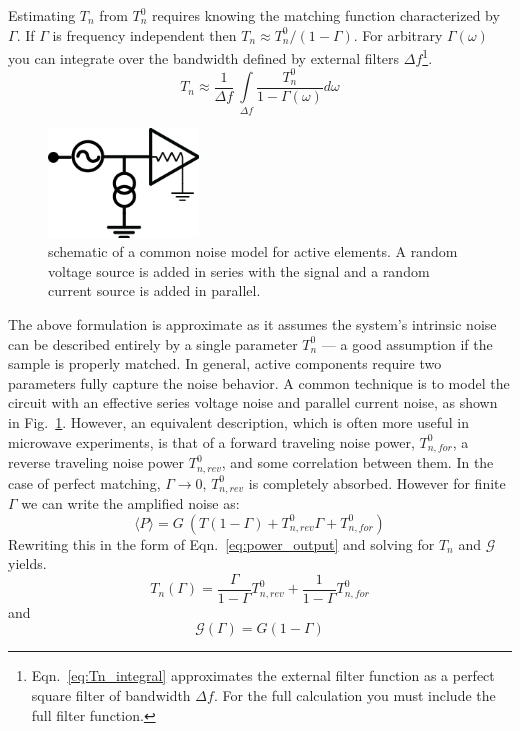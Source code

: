 Estimating $T_n$ from $T_n^0$ requires knowing the matching function characterized by $\Gamma$. If $\Gamma$ is frequency independent then $T_n \approx T_n^0 / (1-\Gamma)$. For arbitrary $\Gamma(\omega)$ you can integrate over the bandwidth defined by external filters $\Delta f$\footnote{Eqn.~\ref{eq:Tn_integral} approximates the external filter function as a perfect square filter of bandwidth $\Delta f$. For the full calculation you must include the full filter function.}.
\begin{equation}\label{eq:Tn_integral}
T_n \approx \frac{1}{\Delta f}\ \int\limits_{\Delta f}\frac{T_n^0}{1-\Gamma(\omega)}d\omega
\end{equation}
\begin{figure}
\centering
\includegraphics[width=40mm]{figures/Johnson_noise_thermometry/schematic_noise_IV.png}
\caption{schematic of a common noise model for active elements. A random voltage source is added in series with the signal and a random current source is added in parallel.}
\label{fig:schematic_noise_IV}
\end{figure}

The above formulation is approximate as it assumes the system's intrinsic noise can be described entirely by a single parameter $T_n^0$ --- a good assumption if the sample is properly matched. In general, active components require two parameters fully capture the noise behavior. A common technique is to model the circuit with an effective series voltage noise and parallel current noise, as shown in Fig.~\ref{fig:schematic_noise_IV}. However, an equivalent description, which is often more useful in microwave experiments, is that of a forward traveling noise power, $T_{n,for}^0$, a reverse traveling noise power $T_{n,rev}^0$, and some correlation between them. In the case of perfect matching, $\Gamma\rightarrow0$, $T_{n,rev}^0$ is completely absorbed. However for finite $\Gamma$ we can write the amplified noise as:
\begin{equation}\label{eq:P_full}
\langle P\rangle=G\ \left(T(1-\Gamma)+T_{n,rev}^0\Gamma+T_{n,for}^0\right)
\end{equation}
Rewriting this in the form of Eqn.~\ref{eq:power_output} and solving for $T_n$ and $\mathcal{G}$ yields.
\begin{equation}\label{eq:Tn_effective_full}
T_n(\Gamma)=\frac{\Gamma}{1-\Gamma}T_{n,rev}^0+\frac{1}{1-\Gamma}T_{n,for}^0
\end{equation}
and
\begin{equation}\label{eq:G_effective_full}
\mathcal{G}(\Gamma)=G(1-\Gamma)
\end{equation}

